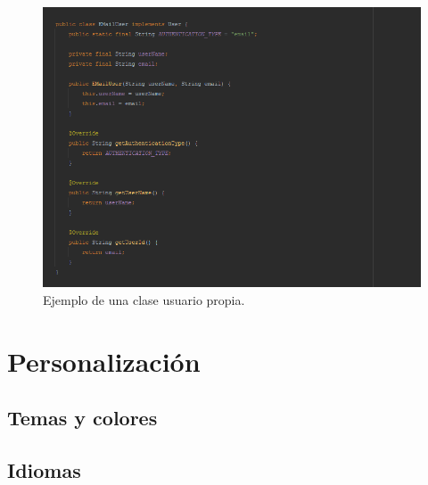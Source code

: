 \begin{figure}[H]
  \centering
    \includegraphics[scale=0.6]{50-anexos/B-uso/identificacion_user_propio.png} 
    \caption{Ejemplo de una clase usuario propia.}
\end{figure}	






\section{Personalización}

\subsection{Temas y colores}

\subsection{Idiomas}




